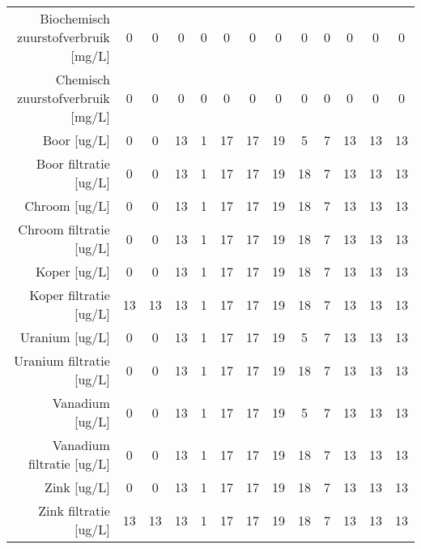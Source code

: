 \begin{tabular}{ r |c | c | c | c | c |c | c | c | c | c | c | c }
Biochemisch zuurstofverbruik [mg/L] &0 & 0 & 0 & 0 & 0 & 0 & 0 & 0 & 0 & 0 & 0 & 0 \\
Chemisch zuurstofverbruik [mg/L] &0 & 0 & 0 & 0 & 0 & 0 & 0 & 0 & 0 & 0 & 0 & 0 \\
Boor [ug/L] &0 & 0 & 13 & 1 & 17 & 17 & 19 & 5 & 7 & 13 & 13 & 13 \\
Boor filtratie [ug/L] &0 & 0 & 13 & 1 & 17 & 17 & 19 & 18 & 7 & 13 & 13 & 13 \\
Chroom [ug/L] &0 & 0 & 13 & 1 & 17 & 17 & 19 & 18 & 7 & 13 & 13 & 13 \\
Chroom filtratie [ug/L] &0 & 0 & 13 & 1 & 17 & 17 & 19 & 18 & 7 & 13 & 13 & 13 \\
Koper [ug/L] &0 & 0 & 13 & 1 & 17 & 17 & 19 & 18 & 7 & 13 & 13 & 13 \\
Koper filtratie [ug/L] &13 & 13 & 13 & 1 & 17 & 17 & 19 & 18 & 7 & 13 & 13 & 13 \\
Uranium [ug/L] &0 & 0 & 13 & 1 & 17 & 17 & 19 & 5 & 7 & 13 & 13 & 13 \\
Uranium filtratie [ug/L] &0 & 0 & 13 & 1 & 17 & 17 & 19 & 18 & 7 & 13 & 13 & 13 \\
Vanadium [ug/L] &0 & 0 & 13 & 1 & 17 & 17 & 19 & 5 & 7 & 13 & 13 & 13 \\
Vanadium filtratie [ug/L] &0 & 0 & 13 & 1 & 17 & 17 & 19 & 18 & 7 & 13 & 13 & 13 \\
Zink [ug/L] &0 & 0 & 13 & 1 & 17 & 17 & 19 & 18 & 7 & 13 & 13 & 13 \\
Zink filtratie [ug/L] &13 & 13 & 13 & 1 & 17 & 17 & 19 & 18 & 7 & 13 & 13 & 13 \\
\end{tabular}    
